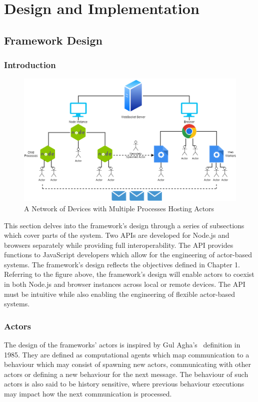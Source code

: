 \documentclass[12pt, a4paper]{report}
\theoremstyle{definition}
\theoremstyle{definition}%
\theoremstyle{definition}%
\theoremstyle{definition}%
\theoremstyle{definition}%
\theoremstyle{definition}%
\begin{document}
\chapter{Design and Implementation}
\section{Framework Design}
\subsection{Introduction}
\begin{figure}[H]
    \begin{centering}
        \includegraphics[width=\textwidth]{resources/network.png}
        \caption{A Network of Devices with Multiple Processes Hosting Actors}
    \end{centering}
\end{figure}
This section delves into the framework's design through a series of subsections which cover parts of the system. Two APIs are developed for Node.js and browsers separately while providing full interoperability. The API provides functions to JavaScript developers which allow for the engineering of actor-based systems. The framework's design reflects the objectives defined in Chapter 1. Referring to the figure above, the framework's design will enable actors to coexist in both Node.js and browser instances across local or remote devices. The API must be intuitive while also enabling the engineering of flexible actor-based systems.
\subsection{Actors}
The design of the frameworks' actors is inspired by Gul Agha's~\cite{agha1985actors} definition in 1985. They are defined as computational agents which map communication to a behaviour which may consist of spawning new actors, communicating with other actors or defining a new behaviour for the next message. The behaviour of such actors is also said to be history sensitive, where previous behaviour executions may impact how the next communication is processed.
\end{document}
